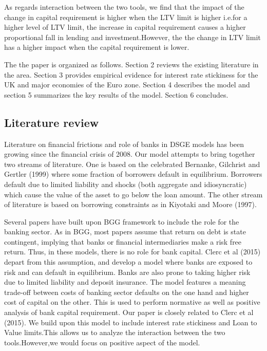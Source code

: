 \documentclass[12pt]{article}
\numberwithin{equation}{section}
\begin{document}
As regards interaction between the two tools, we find that the impact of the change in capital requirement is higher when the LTV limit is higher i.e.for a higher level of LTV limit, the increase in capital requirement causes a higher proportional fall in lending and investment.However, the  the change in LTV limit has a higher impact when the capital requirement is lower.

The the paper is organized as follows. Section 2 reviews the existing literature in the area. Section 3 provides empirical evidence for interest rate stickiness for the UK and major economies of the Euro zone. Section 4 describes the model and section 5 summarizes the key results of the model.
Section 6 concludes.


\subsection{Literature review}


Literature on financial frictions and role of banks in DSGE models has been growing since the financial crisis of 2008. Our model attempts to bring together two streams of literature. One is based on the celebrated Bernanke, Gilchrist and Gertler (1999) where some fraction of borrowers default in equilibrium. Borrowers default due to limited liability and shocks (both aggregate and idiosyncratic) which cause the value of the asset to go below the loan amount. The other stream of literature is based on borrowing constraints as in Kiyotaki and Moore (1997).

Several papers have built upon BGG framework to include the role for the banking sector. As in BGG, most papers assume that return on debt is state contingent, implying that banks or financial intermediaries make a risk free return. Thus, in these models, there is no role for bank capital. Clerc et al (2015) depart from this assumption, and develop a model where banks are exposed to risk and can default in equilibrium. Banks are also prone to taking higher risk due to limited liability and deposit insurance. The model features a meaning trade-off between costs of banking sector defaults on the one hand and higher cost of capital on the other. This is used to perform normative as well as positive analysis of bank capital requirement. Our paper is closely related to Clerc et al (2015). We build upon this model to include interest rate stickiness and  Loan to Value limits.This allows us to analyze the interaction between the two tools.However,we would focus on positive aspect of the model.
\end{document}
